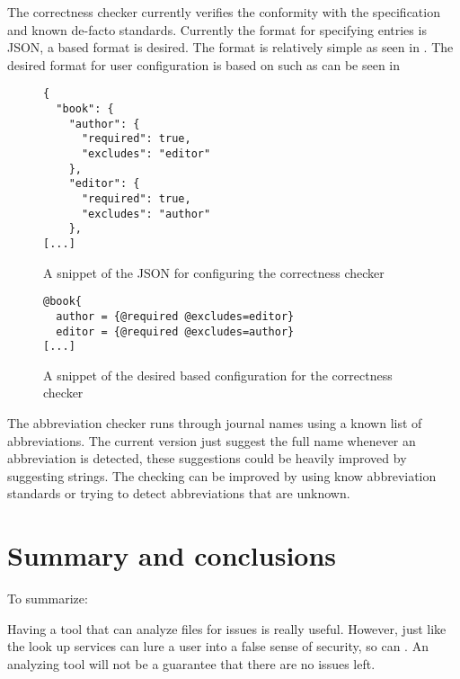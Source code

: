 The correctness checker currently verifies the conformity with the
{\bibtex} specification and known de-facto standards.  Currently the
format for specifying entries is JSON, a {\bibtex} based format is
desired.  The format is relatively simple as seen in
.  The desired format for user
configuration is based on {\bibtex} such as can be seen in

\begin{figure}
  \centering
\begin{verbatim}
{
  "book": {
    "author": {
      "required": true,
      "excludes": "editor"
    },
    "editor": {
      "required": true,
      "excludes": "author"
    },
[...]
\end{verbatim}
  \caption{A snippet of the JSON for configuring the correctness checker}
  \label{fig:correctness_checker_json}
\end{figure}

\begin{figure}
  \centering
\begin{verbatim}
@book{
  author = {@required @excludes=editor}
  editor = {@required @excludes=author}
[...]
\end{verbatim}
  \caption{A snippet of the desired {\bibtex} based configuration for the correctness checker}
  \label{fig:correctness_checker_bibtex}
\end{figure}

The abbreviation checker runs through journal names using a known list
of abbreviations.  The current version just suggest the full name
whenever an abbreviation is detected, these suggestions could be
heavily improved by suggesting strings.  The checking can be improved
by using know abbreviation standards or trying to detect abbreviations
that are unknown.



\section{Summary and conclusions}

To summarize:

Having a tool that can analyze {\bibtex} files for issues is really
useful.  However, just like the look up services can lure a user into
a false sense of security, so can \orangutan.  An analyzing tool will
not be a guarantee that there are no issues left.
